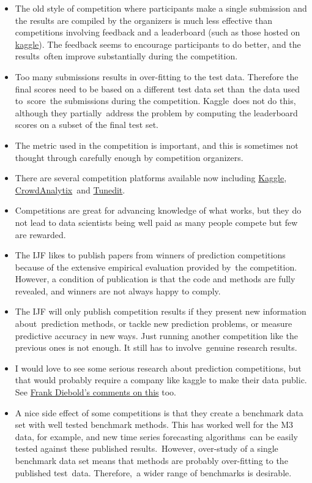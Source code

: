 \documentclass[11pt,a4paper,]{article}
\begin{document}
\begin{itemize}
\item
  The old style of competition where participants make a single submission and the results are compiled by the organizers is much less effective than competitions involving feedback and a leaderboard (such as those hosted on \href{http://www.kaggle.com}{kaggle}). The feedback seems to encourage participants to do better, and the results~often improve substantially during the competition.
\item
  Too many submissions results in over-fitting to the test data. Therefore the final scores need to be based on a different test data set than~the data used to~score~the submissions during the competition. Kaggle~does not do this, although they partially~address the problem by computing the leaderboard scores on a subset of the final test set.
\item
  The metric used in the competition is important, and this is sometimes not thought through carefully enough by competition organizers.
\item
  There are several competition platforms available now including \href{http://kaggle.com}{Kaggle}, \href{http://crowdanalytix.com}{CrowdAnalytix}~and \href{http://tunedit.org/}{Tunedit}.
\item
  Competitions are great for advancing knowledge of what works, but they do not lead to data scientists being well paid as many people compete but few are rewarded.
\item
  The IJF likes to publish papers from winners of prediction competitions because of the extensive empirical evaluation provided by~the competition. However, a condition of publication is that the code and methods are fully revealed, and winners are not always happy to comply.
\item
  The IJF will only publish competition results if they present new information about~prediction methods, or tackle new prediction problems, or measure predictive accuracy in new ways. Just running another competition like the previous ones is not enough. It still has to involve~genuine research results.
\item
  I would love to see some serious research about prediction competitions, but that would probably require a company like kaggle to make their data public. See \href{http://fxdiebold.blogspot.com.au/2014/04/on-kaggle-forecasting-competitions-part_28.html}{Frank Diebold's comments on this} too.
\item
  A nice side effect of some competitions is that they create a benchmark data set with well tested benchmark methods. This has worked well for the M3 data, for example, and new time series forecasting algorithms~can be easily tested against these published results.~However, over-study of a single benchmark data set means that methods are probably over-fitting to the published test~data. Therefore,~a wider range of benchmarks is desirable.

\end{itemize}
\end{document}
